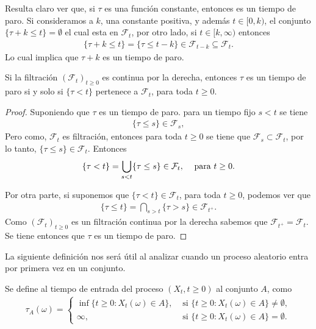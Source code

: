 Resulta claro ver que, si $\tau$ es una función constante, entonces es un tiempo de paro. Si consideramos a $k$, una constante positiva, y además $t \in [0, k)$, el conjunto $\{\tau + k \leq t\} = \emptyset$ el cual esta en $\mathcal{F}_t$, por otro lado, si $t \in [k, \infty)$ entonces
\begin{align*}
\{ \tau + k \leq t \} = \{ \tau \leq t - k \} \in \mathcal{F}_{t-k} \subseteq \mathcal{F}_{t}.
\end{align*}
Lo cual implica que $\tau + k$ es un tiempo de paro.

\begin{proposition}
	\label{paroequivalente}
	Si la filtración $(\mathcal{F}_t)_{t \geq 0}$ es continua por la derecha, entonces $\tau$ es un tiempo de paro si y solo si $\{\tau < t\}$ pertenece a $\mathcal{F}_t$, para toda $t \geq 0$.
\end{proposition}
\begin{proof}
	Suponiendo que $\tau$ es un tiempo de paro. para un tiempo fijo $s < t$ se tiene
	\begin{align*}
	\{ \tau \leq s \} \in \mathcal{F}_s,
	\end{align*}
	Pero como, $\mathcal{F}_t$ es filtración, entonces para toda $t \geq 0$ se tiene que $\mathcal{F}_s \subset \mathcal{F}_t$, por lo tanto, $\{ \tau \leq s \} \in \mathcal{F}_t$. Entonces 
	\begin{align*}
	\{ \tau < t \} = \bigcup_{s < t} \{ \tau \leq s \} \in \mathcal{F}_t, \hspace{0.3cm} \text{ para } t \geq 0.
	\end{align*}
	
	Por otra parte, si suponemos que $\{ \tau < t \} \in \mathcal{F}_t$, para toda $t \geq 0$, podemos ver que 
	\begin{align*}
	\{\tau \leq t \} = \bigcap_{s > t} \{\tau > s\} \in \mathcal{F}_{t^{+}}.
	\end{align*}
	Como $(\mathcal{F}_t)_{t \geq 0}$ es un filtración continua por la derecha sabemos que $\mathcal{F}_{t^{+}} = \mathcal{F}_t$. Se tiene entonces que $\tau$ es un tiempo de paro.
\end{proof}

La siguiente definición nos será útil al analizar cuando un proceso aleatorio entra por primera vez en un conjunto. 
\begin{definition}
	Se define al tiempo de entrada del proceso $(X_t, t \geq 0)$ al conjunto $A$, como
	\begin{align*}
	\tau_A (\omega) = 
	\begin{cases}
	\inf \{ t \geq 0 : X_t (\omega) \in A \}, & \text{ si } \{ t \geq 0 : X_t (\omega) \in A \} \neq \emptyset, \\
	\infty, & \text{ si } \{ t \geq 0 : X_t (\omega) \in A \} = \emptyset.
	\end{cases}
	\end{align*}
\end{definition}

